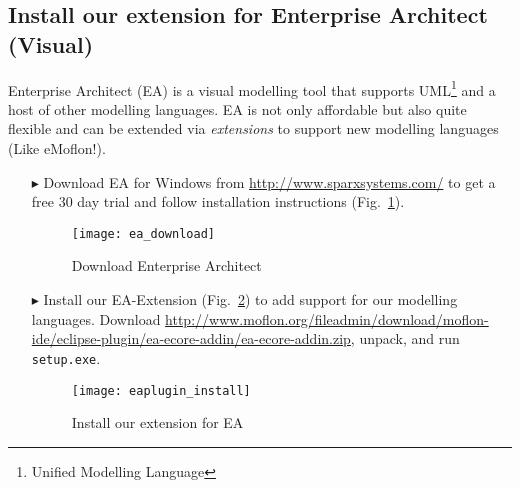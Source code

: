 \visHeader
{}
\subsection{Install our extension for Enterprise Architect (Visual)}

Enterprise Architect (EA) is a visual modelling tool that supports UML\footnote{Unified Modelling Language} and a host of other modelling languages.
EA is not only affordable but also quite flexible and can be extended via \emph{extensions} to support new modelling languages (Like eMoflon!).
\begin{itemize}
\item[$\blacktriangleright$] Download\hypertarget{installEA vis}{} EA for Windows from \url{http://www.sparxsystems.com/} to get a free 30 day trial and follow
installation instructions (Fig.~\ref{fig_enterpriseArchitextHomepage}).

\begin{figure}[htbp]
	\centering
  	\texttt{[image: ea\_download]}
	\caption{Download Enterprise Architect}
	\label{fig_enterpriseArchitextHomepage}
\end{figure} 

\item[$\blacktriangleright$] Install our EA-Extension (Fig.~\ref{fig_eaPluginWizard}) to add support for our modelling languages.
Download \url{http://www.moflon.org/fileadmin/download/moflon-ide/eclipse-plugin/ea-ecore-addin/ea-ecore-addin.zip}, unpack, and run \texttt{setup.exe}.

\begin{figure}[htbp]
	\centering
  \texttt{[image: eaplugin\_install]}
	\caption{Install our extension for EA}
	\label{fig_eaPluginWizard}
\end{figure}
\end{itemize}